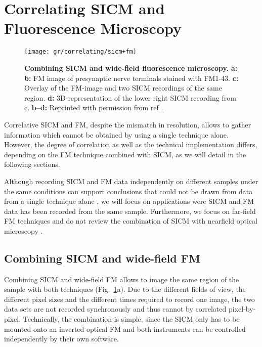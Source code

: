 \section{Correlating SICM and Fluorescence Microscopy}
\label{sec:correlating-sicm-and-fm}

\begin{figure}
  \texttt{[image: gr/correlating/sicm+fm]}
  \caption{%
    \textbf{Combining SICM and wide-field fluorescence microscopy.}
    \textbf{a:}
    \textbf{b:} FM image of presynaptic nerve terminals stained with
    FM1-43. \textbf{c:} Overlay of the FM-image and two SICM recordings of the
    same region. \textbf{d:} 3D-representation of the lower right SICM
    recording from c.
    \textbf{b--d:} Reprinted with permission from ref \cite{Scheenen2015}.
  }
  \label{fig:sicm+fm}
\end{figure}

Correlative SICM and FM, despite the mismatch in resolution, allows to gather
information which cannot be obtained by using a single technique
alone. However, the degree of correlation as well as the technical
implementation differs, depending on the FM technique combined with SICM, as
we will detail in the following sections.

Although recording SICM and FM data independently on different samples under
the same conditions can support conclusions that could not be drawn from data
from a single technique alone \cite{Gesper2017,Lee2013,Lyon2009}, we will
focus on applications were SICM and FM data has been recorded from the same
sample. Furthermore, we focus on far-field FM techniques and do not review the
combination of SICM with nearfield optical microscopy  
\cite{Korchev2000,Shevchuk2001,Rothery2003,Bruckbauer2002}. 


\subsection{Combining SICM and wide-field FM}
\label{sec:SICM+widefield}
Combining SICM and wide-field FM allows to image the same region of the sample
with both techniques (Fig.~\ref{fig:sicm+fm}a). Due to the different fields of
view, the different pixel sizes and the different times required to record one
image, the two data sets are not recorded synchronously and thus cannot by
correlated pixel-by-pixel. Technically, the combination is simple, since
the SICM only has to be mounted onto an inverted optical FM and both
instruments can be controlled independently by their own software.

